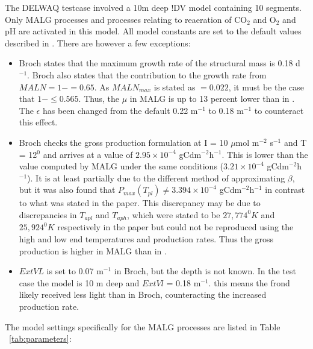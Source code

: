 \documentclass{deltares_manual}
\begin{document}
The DELWAQ testcase involved a 10m deep !DV model containing 10 segments. Only MALG processes and processes relating to reaeration of CO$_{2}$ and O$_{2}$ and pH are activated in this model. All model constants are set to the default values described in \cite{broch2012}. There are however a few exceptions:
\begin{itemize}
	\item Broch states that the maximum growth rate of the structural mass is 0.18 d$^{-1}$. Broch also states that the contribution to the growth rate from $MALN = 1-  = 0.65$. As $MALN_{max}$ is stated as $= 0.022$, it must be the case that $1- \leq 0.565$. Thus, the $\mu$ in MALG is up to 13 percent lower than in \cite{broch2012}. The $\epsilon$ has been changed from the default 0.22 m$^{-1}$ to 0.18 m$^{-1}$ to counteract this effect.
	\item Broch checks the gross production formulation at I = 10 $\mu$mol m$^{-2}$ s$^{-1}$ and T = 12$^{0}$ and arrives at a value of $2.95 \times 10^{-4}$ gCdm$^{-2}$h$^{-1}$. This is lower than the value computed by MALG under the same conditions ($3.21  \times 10^{-4}$ gCdm$^{-2}$h$^{-1}$). It is at least partially due to the different method of approximating $\beta$, but it was also found that $P_{max}(T_{pl}) \neq 3.394  \times 10^{-4}$ gCdm$^{-2}$h$^{-1}$ in contrast to what was stated in the paper. This discrepancy may be due to discrepancies in $T_{apl}$ and $T_{aph}$, which were stated to be $27,774^{0}K$ and $25,924^{0}K$ respectively in the paper but could not be reproduced using the high and low end temperatures and production rates. Thus the gross production is higher in MALG than in \cite{broch2012}.
	\item $ExtVL$ is set to 0.07 m$^{-1}$ in Broch, but the depth is not known. In the test case the model is 10 m deep and $ExtVl$ = 0.18 m$^{-1}$. this means the frond likely received less light than in Broch, counteracting the increased production rate.
\end{itemize}

The model settings specifically for the MALG processes are listed in Table ~\ref{tab:parameters}:
\end{document}
